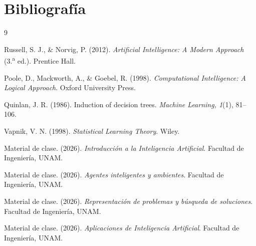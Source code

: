 \section{Bibliografía}

\begin{thebibliography}{9}

Russell, S. J., \& Norvig, P. (2012). \textit{Artificial Intelligence: A Modern Approach} (3.\textsuperscript{a} ed.). Prentice Hall.

Poole, D., Mackworth, A., \& Goebel, R. (1998). \textit{Computational Intelligence: A Logical Approach}. Oxford University Press.

Quinlan, J. R. (1986). Induction of decision trees. \textit{Machine Learning, 1}(1), 81--106.

Vapnik, V. N. (1998). \textit{Statistical Learning Theory}. Wiley.

Material de clase. (2026). \textit{Introducción a la Inteligencia Artificial}. Facultad de Ingeniería, UNAM.

Material de clase. (2026). \textit{Agentes inteligentes y ambientes}. Facultad de Ingeniería, UNAM.

Material de clase. (2026). \textit{Representación de problemas y búsqueda de soluciones}. Facultad de Ingeniería, UNAM.

Material de clase. (2026). \textit{Aplicaciones de Inteligencia Artificial}. Facultad de Ingeniería, UNAM.

\end{thebibliography}
